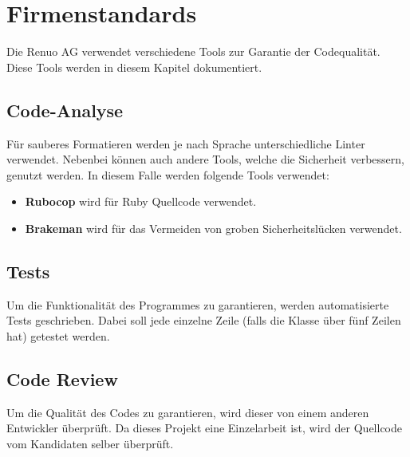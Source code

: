 \chapter{Firmenstandards}
Die Renuo AG verwendet verschiedene Tools zur Garantie der Codequalität. Diese Tools werden in diesem Kapitel dokumentiert.

\section{Code-Analyse}
Für sauberes Formatieren werden je nach Sprache unterschiedliche \gls{Linter} verwendet. Nebenbei können auch andere Tools, welche die Sicherheit verbessern, genutzt werden. In diesem Falle werden folgende Tools verwendet:

\begin{itemize}
    \item \textbf{Rubocop} wird für Ruby Quellcode verwendet.
    \item \textbf{Brakeman} wird für das Vermeiden von groben Sicherheitslücken verwendet.
\end{itemize}

\section{Tests}
Um die Funktionalität des Programmes zu garantieren, werden automatisierte Tests geschrieben. Dabei soll jede einzelne Zeile (falls die Klasse über fünf Zeilen hat) getestet werden.

\section{Code Review}
Um die Qualität des Codes zu garantieren, wird dieser von einem anderen Entwickler überprüft. Da dieses Projekt eine Einzelarbeit ist, wird der Quellcode vom Kandidaten selber überprüft.
